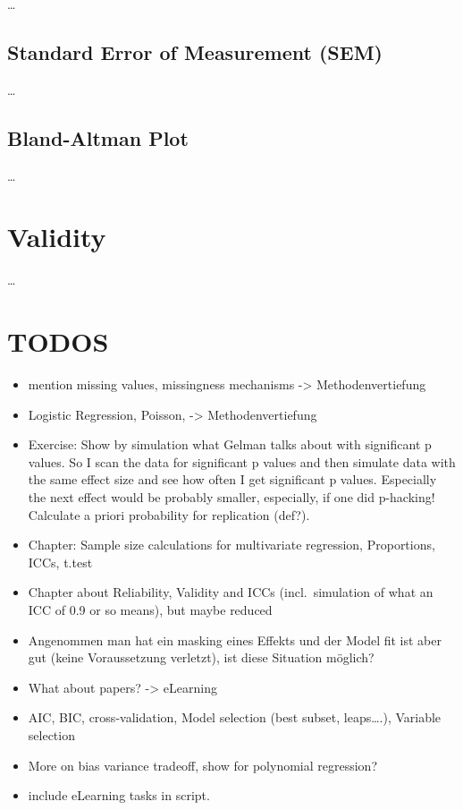 \documentclass[
]{book}
\providecommand{\tightlist}{%
  \setlength{\itemsep}{0pt}\setlength{\parskip}{0pt}}
\begin{document}
\ldots{}

\subsection{Standard Error of Measurement (SEM)}\label{standard-error-of-measurement-sem}

\ldots{}

\subsection{Bland-Altman Plot}\label{bland-altman-plot}

\ldots{}

\section{Validity}\label{validity}

\ldots{}

\section{TODOS}\label{todos}

\begin{itemize}
\tightlist
\item
  mention missing values, missingness mechanisms -\textgreater{} Methodenvertiefung
\item
  Logistic Regression, Poisson, -\textgreater{} Methodenvertiefung
\item
  Exercise: Show by simulation what Gelman talks about with significant p values. So I scan the data
  for significant p values and then simulate data with the same effect size and see how often
  I get significant p values. Especially the next effect would be probably smaller,
  especially, if one did p-hacking! Calculate a priori probability for replication (def?).
\item
  Chapter: Sample size calculations for multivariate regression, Proportions, ICCs, t.test
\item
  Chapter about Reliability, Validity and ICCs (incl.~simulation of what an ICC of 0.9 or so means), but maybe reduced
\item
  Angenommen man hat ein masking eines Effekts und der Model fit ist aber gut (keine Voraussetzung verletzt),
  ist diese Situation möglich?
\item
  What about papers? -\textgreater{} eLearning
\item
  AIC, BIC, cross-validation, Model selection (best subset, leaps\ldots.), Variable selection
\item
  More on bias variance tradeoff, show for polynomial regression?
\item
  include eLearning tasks in script.
\end{itemize}


\end{document}
